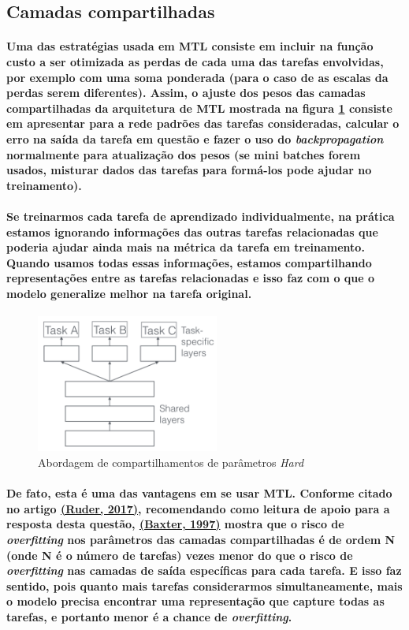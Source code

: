 \documentclass[a4paper]{article}    %
\begin{document}
\subsection{Camadas compartilhadas}
\paragraph{Uma das estratégias usada em MTL consiste em incluir na função custo a ser otimizada as perdas de cada uma das tarefas envolvidas, por exemplo com uma soma ponderada (para o caso de as escalas da perdas serem diferentes). Assim, o ajuste dos pesos das camadas compartilhadas da arquitetura de MTL mostrada na figura \ref{fig:q7} consiste em apresentar para a rede padrões das tarefas consideradas, calcular o erro na saída da tarefa em questão e fazer o uso do \emph{backpropagation} normalmente para atualização dos pesos (se mini batches forem usados, misturar dados das tarefas para formá-los pode ajudar no treinamento).}

\paragraph{Se treinarmos cada tarefa de aprendizado individualmente, na prática estamos ignorando informações das outras tarefas relacionadas que poderia ajudar ainda mais na métrica da tarefa em treinamento. Quando usamos todas essas informações, estamos compartilhando representações entre as tarefas relacionadas e isso faz com o que o modelo generalize melhor na tarefa original.}

\begin{figure}[H]
    \centering
    \includegraphics[width=6cm]{Q7}
    \caption{Abordagem de compartilhamentos de parâmetros \emph{Hard}}
    \label{fig:q7}
\end{figure}

\paragraph{De fato, esta é uma das vantagens em se usar MTL. Conforme citado no artigo \href{https://arxiv.org/pdf/1706.05098.pdf}{(Ruder, 2017)}, recomendando como leitura de apoio para a resposta desta questão, \href{https://link.springer.com/content/pdf/10.1023/A:1007327622663.pdf}{(Baxter, 1997)} mostra que o risco de \emph{overfitting} nos parâmetros das camadas compartilhadas é de ordem N (onde N é o número de tarefas) vezes menor do que o risco de \emph{overfitting } nas camadas de saída específicas para cada tarefa. E isso faz sentido, pois quanto mais tarefas considerarmos simultaneamente, mais o modelo precisa encontrar uma representação que capture todas as tarefas, e portanto menor é a chance de \emph{overfitting}.}
\end{document}

